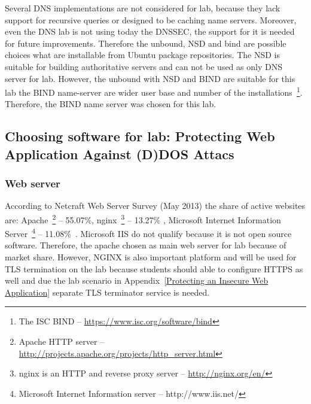 Several \gls{DNS} implementations are not considered for lab, because they lack support for recursive queries or designed to be caching name servers. Moreover, even the \gls{DNS} lab is not using today the \gls{DNSSEC}, the support for it is needed for future improvements. Therefore the unbound, NSD and bind are possible choices what are installable from Ubuntu package repositories. The NSD is suitable for building authoritative servers and can not be used as only \gls{DNS} server for lab.
However, the unbound with NSD and BIND are suitable for this lab the BIND name-server are wider user base and number of the installations~\footnote{The \gls{ISC} BIND -- \url{https://www.isc.org/software/bind}}. Therefore, the BIND name server was chosen for this lab.


\subsection{Choosing software for lab: Protecting Web Application Against (D)DOS Attacs}

\subsubsection{Web server}
According to Netcraft Web Server Survey (May 2013) the share of active websites are: Apache~\footnote{Apache \gls{HTTP} server -- \url{http://projects.apache.org/projects/http_server.html}} -- 55.07\%,  nginx~\footnote{nginx is an HTTP and reverse proxy server -- \url{http://nginx.org/en/}} -- 13.27\%	, Microsoft Internet Information Server~\footnote{Microsoft Internet Information server -- http://www.iis.net/} -- 11.08\%~\citep{website:netcraft_web}. Microsoft IIS do not qualify because it is not open source software. Therefore, the apache chosen as main web server for lab because of market share. However, NGINX is also important platform and will be used for \gls{TLS} termination on the lab because students should able to configure \gls{HTTPS} as well and due the lab scenario in Appendix~\ref{Protecting an Insecure Web Application} separate \gls{TLS} terminator service is needed.

